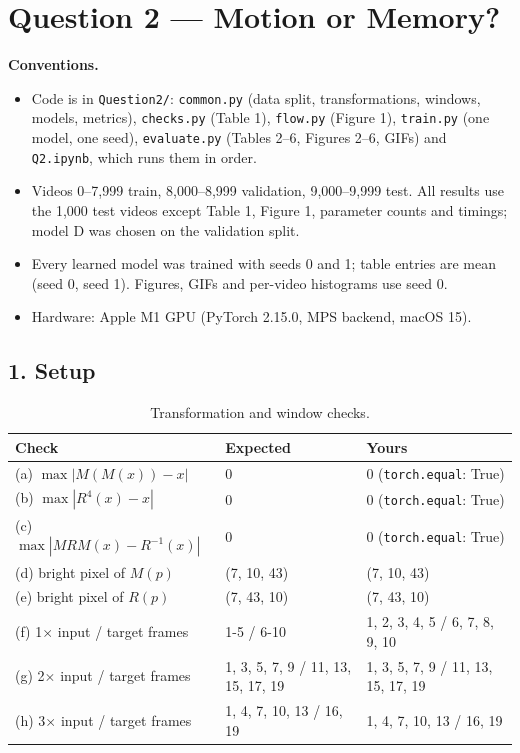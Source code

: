 \documentclass[11pt]{article}
\begin{document}
\newpage
\section*{Question 2 --- Motion or Memory?}
\textbf{Conventions.}
{\raggedright
\begin{itemize}
  \item Code is in \texttt{Question2/}: \texttt{common.py} (data split, transformations, windows, models, metrics),
  \texttt{checks.py} (Table 1), \texttt{flow.py} (Figure 1), \texttt{train.py} (one model, one seed),
  \texttt{evaluate.py} (Tables 2--6, Figures 2--6, GIFs) and \texttt{Q2.ipynb}, which runs them in order.
  \item Videos 0--7,999 train, 8,000--8,999 validation, 9,000--9,999 test. All results use the 1,000 test videos
  except Table 1, Figure 1, parameter counts and timings; model D was chosen on the validation split.
  \item Every learned model was trained with seeds 0 and 1; table entries are mean (seed 0, seed 1). Figures, GIFs
  and per-video histograms use seed 0.
  \item Hardware: Apple M1 GPU (PyTorch 2.15.0, MPS backend, macOS 15).
\end{itemize}}
\subsection*{1. Setup}
\begin{table}[!htbp]\centering\footnotesize\setlength{\tabcolsep}{4pt}
\begin{tabular}{lll}
\toprule
Check & Expected & Yours\\
\midrule
(a) $\max|M(M(x))-x|$ & 0 & 0 (\texttt{torch.equal}: True)\\
(b) $\max|R^4(x)-x|$ & 0 & 0 (\texttt{torch.equal}: True)\\
(c) $\max|MRM(x)-R^{-1}(x)|$ & 0 & 0 (\texttt{torch.equal}: True)\\
(d) bright pixel of $M(p)$ & (7, 10, 43) & (7, 10, 43)\\
(e) bright pixel of $R(p)$ & (7, 43, 10) & (7, 43, 10)\\
(f) 1$\times$ input / target frames & 1-5 / 6-10 & 1, 2, 3, 4, 5 / 6, 7, 8, 9, 10\\
(g) 2$\times$ input / target frames & 1, 3, 5, 7, 9 / 11, 13, 15, 17, 19 & 1, 3, 5, 7, 9 / 11, 13, 15, 17, 19\\
(h) 3$\times$ input / target frames & 1, 4, 7, 10, 13 / 16, 19 & 1, 4, 7, 10, 13 / 16, 19\\
\bottomrule
\end{tabular}
\caption{Transformation and window checks.}
\end{table}
\end{document}
